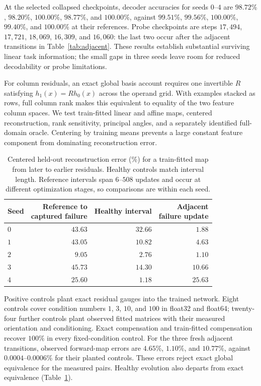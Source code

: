 At the selected collapsed checkpoints, decoder accuracies for seeds $0$--$4$ are $98.72\%$, $98.20\%$, $100.00\%$, $98.77\%$, and $100.00\%$, against $99.51\%$, $99.56\%$, $100.00\%$, $99.40\%$, and $100.00\%$ at their references. Probe checkpoints are steps $17{,}494$, $17{,}721$, $18{,}069$, $16{,}309$, and $16{,}060$: the last two occur after the adjacent transitions in Table~\ref{tab:adjacent}. These results establish substantial surviving linear task information; the small gaps in three seeds leave room for reduced decodability or probe limitations.

For column residuals, an exact global basis account requires one invertible $R$ satisfying $h_1(x)=Rh_0(x)$ across the operand grid. With examples stacked as rows, full column rank makes this equivalent to equality of the two feature column spaces. We test train-fitted linear and affine maps, centered reconstruction, rank sensitivity, principal angles, and a separately identified full-domain oracle. Centering by training means prevents a large constant feature component from dominating reconstruction error.

\begin{table}[htbp]
\centering
\small
\caption{Centered held-out reconstruction error (\%) for a train-fitted map from later to earlier residuals. Healthy controls match interval length. Reference intervals span $6$--$508$ updates and occur at different optimization stages, so comparisons are within each seed.}
\label{tab:followup-geometry}
\begin{tabular}{lrrr}
\toprule
Seed & \shortstack{Reference to\\captured failure} & Healthy interval & \shortstack{Adjacent\\failure update} \\
\midrule
$0$ & $43.63$ & $32.66$ & $1.88$ \\
$1$ & $43.05$ & $10.82$ & $4.63$ \\
$2$ & $9.05$ & $2.76$ & $1.10$ \\
$3$ & $45.73$ & $14.30$ & $10.66$ \\
$4$ & $25.60$ & $1.18$ & $25.63$ \\
\bottomrule
\end{tabular}
\end{table}

Positive controls plant exact residual gauges into the trained network. Eight controls cover condition numbers $1$, $3$, $10$, and $100$ in float32 and float64; twenty-four further controls plant observed fitted matrices with their measured orientation and conditioning. Exact compensation and train-fitted compensation recover $100\%$ in every fixed-condition control. For the three fresh adjacent transitions, observed forward-map errors are $4.65\%$, $1.10\%$, and $10.77\%$, against $0.0004$--$0.0006\%$ for their planted controls. These errors reject exact global equivalence for the measured pairs. Healthy evolution also departs from exact equivalence (Table~\ref{tab:followup-geometry}).

